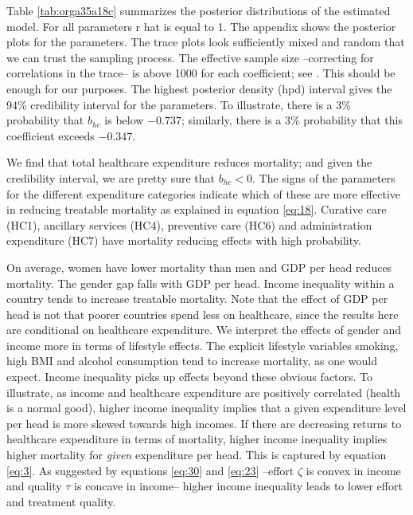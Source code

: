 \documentclass[12pt,english,a4paper]{article}
\begin{document}
Table \ref{tab:orga35a18c} summarizes the posterior distributions of the estimated model. For all parameters r hat is equal to 1. The appendix shows the posterior plots for the parameters. The trace plots look sufficiently mixed and random that we can trust the sampling process. The effective sample size --correcting for correlations in the trace-- is above 1000 for each coefficient; see \cite{GelmanBook}. This should be enough for our purposes. The highest posterior density (hpd) interval gives the 94\% credibility interval for the parameters. To illustrate, there is a 3\% probability that \(b_{hc}\) is below \(-0.737\); similarly, there is a 3\% probability that this coefficient exceeds \(-0.347\).

We find that total healthcare expenditure reduces mortality; and given the credibility interval, we are pretty sure that \(b_{hc} < 0\). The signs of the parameters for the different expenditure categories indicate which of these are more effective in reducing treatable mortality as explained in equation \eqref{eq:18}. Curative care (HC1), ancillary services (HC4), preventive care (HC6) and administration expenditure (HC7) have mortality reducing effects with high probability.

On average, women have lower mortality than men and GDP per head reduces mortality. The gender gap falls with GDP per head. Income inequality within a country tends to increase treatable mortality. Note that the effect of GDP per head is not that poorer countries spend less on healthcare, since the results here are conditional on healthcare expenditure. We interpret the effects of gender and income more in terms of lifestyle effects. The explicit lifestyle variables smoking, high BMI and alcohol consumption tend to increase mortality, as one would expect. Income inequality picks up effects beyond these obvious factors. To illustrate, as income and healthcare expenditure are positively correlated (health is a normal good), higher income inequality implies that a given expenditure level per head is more skewed towards high incomes. If there are decreasing returns to healthcare expenditure in terms of mortality, higher income inequality implies higher mortality for \emph{given} expenditure per head. This is captured by equation \eqref{eq:3}. As suggested by equations \eqref{eq:30} and \eqref{eq:23} --effort \(\zeta\) is convex in income and quality \(\tau\) is concave in income-- higher income inequality leads to lower effort and treatment quality.
\end{document}
